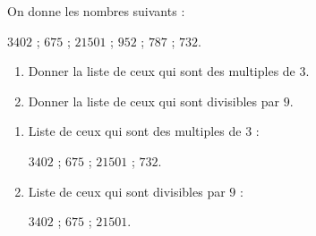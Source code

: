 \begin{exercice*}
    On donne les nombres suivants :
    
    $\num{3 402}$ ; $\num{675}$ ; $\num{21 501}$ ; $\num{952}$ ; $\num{787}$ ; $\num{732}$.
    \begin{enumerate}
        \item Donner la liste de ceux qui sont des multiples de $3$.
        \item Donner la liste de ceux qui sont divisibles par $9$.
    \end{enumerate}
\end{exercice*}
\begin{corrige}
    \begin{enumerate}
        \item Liste de ceux qui sont des multiples de $3$ :
        
        $\num{3 402}$ ; $\num{675}$ ; $\num{21 501}$ ; $\num{732}$.
        \item Liste de ceux qui sont divisibles par $9$ :
        
        $\num{3 402}$ ; $\num{675}$ ; $\num{21 501}$. 
    \end{enumerate}
\end{corrige}

